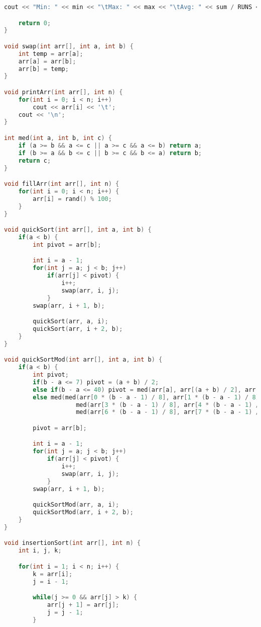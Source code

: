 \documentclass[letterpaper, 11pt]{article}
\begin{document}
\begin{lstlisting}[language=c++, caption=main.cpp]
    cout << "Min: " << min << "\tMax: " << max << "\tAvg: " << sum / RUNS << '\n';

    return 0;
}

void swap(int arr[], int a, int b) {
    int temp = arr[a];
    arr[a] = arr[b];
    arr[b] = temp;
}

void printArr(int arr[], int n) {
    for(int i = 0; i < n; i++)
        cout << arr[i] << '\t';
    cout << '\n';
}

int med(int a, int b, int c) {
    if (a >= b && a <= c || a >= c && a <= b) return a;
    if (b >= a && b <= c || b >= c && b <= a) return b;
    return c;
}

void fillArr(int arr[], int n) {
    for(int i = 0; i < n; i++) {
        arr[i] = rand() % 100;
    }
}

void quickSort(int arr[], int a, int b) {
    if(a < b) {
        int pivot = arr[b];

        int i = a - 1;
        for(int j = a; j < b; j++) 
            if(arr[j] < pivot) {
                i++;
                swap(arr, i, j);
            }
        swap(arr, i + 1, b);

        quickSort(arr, a, i);
        quickSort(arr, i + 2, b);
    }
}

void quickSortMod(int arr[], int a, int b) {
    if(a < b) {
        int pivot;
        if(b - a <= 7) pivot = (a + b) / 2;
        else if(b - a <= 40) pivot = med(arr[a], arr[(a + b) / 2], arr[b]);
        else med(med(arr[0 * (b - a - 1) / 8], arr[1 * (b - a - 1) / 8], arr[2 * (b - a - 1) / 8]), 
                    med(arr[3 * (b - a - 1) / 8], arr[4 * (b - a - 1) / 8], arr[5 * (b - a - 1) / 8]), 
                    med(arr[6 * (b - a - 1) / 8], arr[7 * (b - a - 1) / 8], arr[8 * (b - a - 1) / 8]));

        pivot = arr[b];

        int i = a - 1;
        for(int j = a; j < b; j++) 
            if(arr[j] < pivot) {
                i++;
                swap(arr, i, j);
            }
        swap(arr, i + 1, b);

        quickSortMod(arr, a, i);
        quickSortMod(arr, i + 2, b);
    }
}

void insertionSort(int arr[], int n) {
    int i, j, k;

    for(int i = 1; i < n; i++) {
        k = arr[i];
        j = i - 1;

        while(j >= 0 && arr[j] > k) {
            arr[j + 1] = arr[j];
            j = j - 1;
        }


\end{lstlisting}
\end{document}
